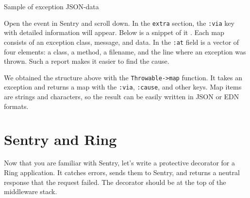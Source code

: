 \begin{listing}[ht!]

\ifx\DEVICETYPE\MOBILE

\begin{json}
\end{json}

\else

\begin{json}
\end{json}

\fi

  \caption{Sample of exception JSON-data}
  \label{fig:ex-json-data}
\end{listing}

Open the event in Sentry and scroll down. In the \verb|extra| section, the \verb|:via| key with detailed information will appear. Below is a snippet of it . Each map consists of an exception class, message, and data. In the \verb|:at| field is a vector of four elements: a class, a method, a filename, and the line where an exception was thrown. Such a report makes it easier to find the cause.


We obtained the structure above with the \texttt{Throw\-able->map} function. It takes an exception and returns a map with the \verb|:via|, \verb|:cause|, and other keys.
Map items are strings and characters, so the result can be easily written in JSON or EDN formats.

\section{Sentry and Ring}


Now that you are familiar with Sentry, let's write a protective decorator for a Ring application. It catches errors, sends them to Sentry, and returns a neutral response that the request failed. The decorator should be at the top of the middleware stack.

